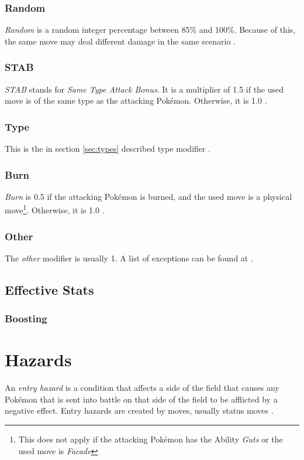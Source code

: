 \subsubsection{Random}
\textit{Random} is a random integer percentage between 85\% and 100\%. Because of this, the same move
may deal different damage in the same scenario \cite{Bulbapedia:Damage}.

\subsubsection{STAB}
\textit{STAB} stands for \textit{Same Type Attack Bonus}. It is a multiplier of 1.5 if the used move
is of the same type as the attacking Pokémon. Otherwise, it is 1.0 \cite{Bulbapedia:Damage}.

\subsubsection{Type}
This is the in section \ref{sec:types} described type modifier \cite{Bulbapedia:Damage}.

\subsubsection{Burn}
\textit{Burn} is 0.5 if the attacking Pokémon is burned, and the used move
is a physical move\footnote{This does not apply if the attacking Pokémon has the Ability \textit{Guts}
or the used move is \textit{Facade}}. Otherwise, it is 1.0 \cite{Bulbapedia:Damage}.

\subsubsection{Other}
The \textit{other} modifier is usually 1. A list of exceptions can be found at \cite{Bulbapedia:Damage}.

\subsection{Effective Stats}
\subsubsection{Boosting}
\label{sec:boosting}

\section{Hazards}
An \textit{entry hazard} is a condition that affects a side of the field that causes
any Pokémon that is sent into battle on that side of the field to be afflicted by 
a negative effect. Entry hazards are created by moves, usually status moves
\cite{Bulbapedia:EntryHazards}. \\
